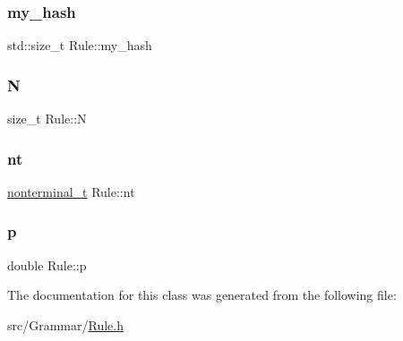 \mbox{\label{class_rule_af2d873c97e2de425f14a5a980dbcc104}} 
\subsubsection{\texorpdfstring{my\+\_\+hash}{my\_hash}}
{\footnotesize\ttfamily std\+::size\+\_\+t Rule\+::my\+\_\+hash\hspace{0.3cm}{\ttfamily [protected]}}

\mbox{\label{class_rule_a0a2a742af39b60831ad1ac5eb5ba7498}} 
\subsubsection{\texorpdfstring{N}{N}}
{\footnotesize\ttfamily size\+\_\+t Rule\+::N}

\mbox{\label{class_rule_a980385e76137909454bd6a585bd2e138}} 
\subsubsection{\texorpdfstring{nt}{nt}}
{\footnotesize\ttfamily \hyperlink{_nonterminal_8h_a5c1f658dc7560600a16d22408bd716ca}{nonterminal\+\_\+t} Rule\+::nt}

\mbox{\label{class_rule_acd7e4d41d59dec76f60ca16238ab391a}} 
\subsubsection{\texorpdfstring{p}{p}}
{\footnotesize\ttfamily double Rule\+::p}



The documentation for this class was generated from the following file\+:\begin{DoxyCompactItemize}
\item 
src/\+Grammar/\hyperlink{_rule_8h}{Rule.\+h}\end{DoxyCompactItemize}
